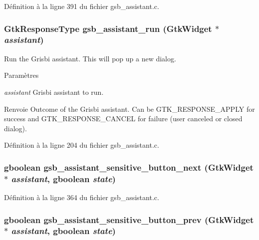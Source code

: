 Définition à la ligne 391 du fichier gsb\_\-assistant.c.

\subsubsection[{gsb\_\-assistant\_\-run}]{\setlength{\rightskip}{0pt plus 5cm}GtkResponseType gsb\_\-assistant\_\-run (GtkWidget $\ast$ {\em assistant})}\label{gsb__assistant_8h_a886a6fa8c458d71d7cfae7b54bd3187f}
Run the Grisbi assistant. This will pop up a new dialog.


\begin{DoxyParams}{Paramètres}
\item[{\em assistant}]Grisbi assistant to run.\end{DoxyParams}
\begin{DoxyReturn}{Renvoie}
Outcome of the Grisbi assistant. Can be GTK\_\-RESPONSE\_\-APPLY for success and GTK\_\-RESPONSE\_\-CANCEL for failure (user canceled or closed dialog). 
\end{DoxyReturn}


Définition à la ligne 204 du fichier gsb\_\-assistant.c.

\subsubsection[{gsb\_\-assistant\_\-sensitive\_\-button\_\-next}]{\setlength{\rightskip}{0pt plus 5cm}gboolean gsb\_\-assistant\_\-sensitive\_\-button\_\-next (GtkWidget $\ast$ {\em assistant}, \/  gboolean {\em state})}\label{gsb__assistant_8h_ad38c5d761d97d2257a4b35a52c4048c6}


Définition à la ligne 364 du fichier gsb\_\-assistant.c.

\subsubsection[{gsb\_\-assistant\_\-sensitive\_\-button\_\-prev}]{\setlength{\rightskip}{0pt plus 5cm}gboolean gsb\_\-assistant\_\-sensitive\_\-button\_\-prev (GtkWidget $\ast$ {\em assistant}, \/  gboolean {\em state})}\label{gsb__assistant_8h_ae21578dcc45348d3400059b9c6794252}


